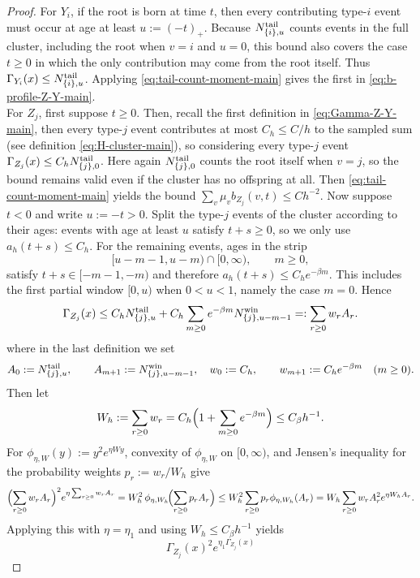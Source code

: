 \documentclass{article}
\begin{document}
\begin{proof}
For $Y_i$, if the root is born at time $t$, then every contributing type-$i$ event must occur at age at least $u:=(-t)_+$. Because $N_{\{i\},u}^{\rm tail}$ counts events in the full cluster, including the root when $v=i$ and $u=0$, this bound also covers the case $t\ge 0$ in which the only contribution may come from the root itself. Thus $\Gamma_{Y_i}(x)\le N_{\{i\},u}^{\rm tail}$. Applying \eqref{eq:tail-count-moment-main} gives the first in \eqref{eq:b-profile-Z-Y-main}.\\
For $Z_j$, first suppose $t\ge 0$. Then, recall the first definition in \eqref{eq:Gamma-Z-Y-main}, then every type-$j$ event contributes at most $C_h\le C/h$ to the sampled sum (see definition \eqref{eq:H-cluster-main}), so considering every type-$j$ event $\Gamma_{Z_j}(x)\le C_h N_{\{j\},0}^{\rm tail}$. Here again $N_{\{j\},0}^{\rm tail}$ counts the root itself when $v=j$, so the bound remains valid even if the cluster has no offspring at all. Then \eqref{eq:tail-count-moment-main} yields the bound $\sum_v\mu_v b_{Z_j}(v,t)\le C h^{-2}$. Now suppose $t<0$ and write $u:=-t>0$. Split the type-$j$ events of the cluster according to their ages: events with age at least $u$ satisfy $t+s\ge 0$, so we only use $a_h(t+s)\le C_h$. For the remaining events, ages in the strip
\[
[u-m-1,u-m)\cap[0,\infty),\qquad m\ge 0,
\]
satisfy $t+s\in[-m-1,-m)$ and therefore $a_h(t+s)\le C_h e^{-\beta m}$. This includes the first partial window $[0,u)$ when $0<u<1$, namely the case $m=0$. Hence
\begin{equation}
\label{eq:Gamma-Z-strip-main}
\Gamma_{Z_j}(x)
\le C_h N_{\{j\},u}^{\rm tail}
+ C_h\sum_{m\ge 0} e^{-\beta m} N_{\{j\},u-m-1}^{\rm win}=:\sum_{r\ge 0} w_r A_r.
\end{equation}
where in the last definition we set
\[
A_0:=N_{\{j\},u}^{\rm tail},
\qquad
A_{m+1}:=N_{\{j\},u-m-1}^{\rm win}, \quad w_0:=C_h, \qquad w_{m+1}:=C_h e^{-\beta m}\quad (m\ge 0).
\]
Then let
\[
W_h:=\sum_{r\ge 0} w_r = C_h\Bigl(1+\sum_{m\ge 0}e^{-\beta m}\Bigr)\le C_\beta h^{-1}.
\]
For $\phi_{\eta,W}(y):=y^2 e^{\eta W y}$, convexity of $\phi_{\eta,W}$ on $[0,\infty)$, and Jensen's inequality for the probability weights $p_r:=w_r/W_h$ give
\[
\Bigl(\sum_{r\ge 0} w_r A_r\Bigr)^2 e^{\eta \sum_{r\ge 0} w_r A_r}
= W_h^2\, \phi_{\eta,W_h}\!\Bigl(\sum_{r\ge 0} p_r A_r\Bigr)
\le W_h^2 \sum_{r\ge 0} p_r \phi_{\eta,W_h}(A_r)
= W_h \sum_{r\ge 0} w_r A_r^2 e^{\eta W_h A_r}.
\]
Applying this with $\eta=\eta_1$ and using $W_h\le C_\beta h^{-1}$ yields
\[
\Gamma_{Z_j}(x)^2 e^{\eta_1\Gamma_{Z_j}(x)}
\]
\end{proof}
\end{document}

